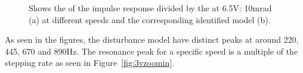 \begin{figure}[h!]
  \centering %
  \qquad
  \caption{\label{fig:fft_6_5_modelfit} Shows the \abbrFFT of the impulse response divided by the \abbrFFT at 6.5V: 10mrad (a) at different speeds and the corresponding identified model (b).}
\end{figure}

As seen in the figures, the disturbance model have distinct peaks at around 220, 445, 670 and 890Hz. The resonance peak for a specific speed is a multiple of the stepping rate as seen in Figure~\ref{fig:3vzoomin}.

